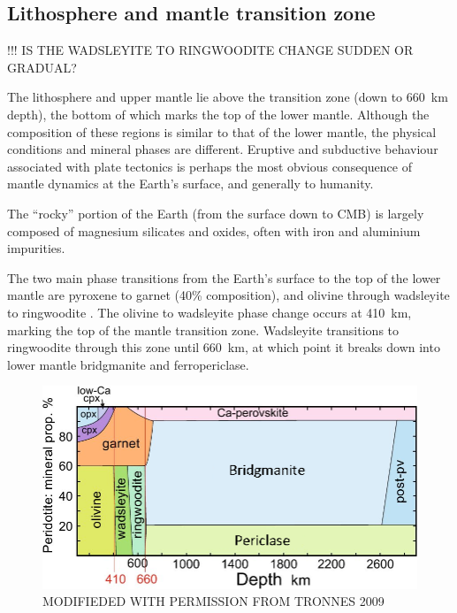 \subsection{Lithosphere and mantle transition zone}

!!! IS THE WADSLEYITE TO RINGWOODITE CHANGE SUDDEN OR GRADUAL?

The lithosphere and upper mantle lie above the transition zone (down to 660~km depth), the bottom of which marks the top of the lower mantle. Although the composition of these regions is similar to that of the lower mantle, the physical conditions and mineral phases are different. Eruptive and subductive behaviour associated with plate tectonics is perhaps the most obvious consequence of mantle dynamics at the Earth's surface, and generally to humanity.

The ``rocky'' portion of the Earth (from the surface down to CMB) is largely 
composed of magnesium silicates and oxides, often with iron and aluminium impurities. 

The two main phase transitions from the Earth's surface to the top of the lower mantle are pyroxene to garnet (40\% composition), and olivine through wadsleyite to ringwoodite \citep[60\%, see Figure~\ref{fig:tronnes_perid_comp}][]{Tronnes2009}. The olivine to wadsleyite phase change occurs at 410~km, marking the top of the mantle transition zone. Wadsleyite transitions to ringwoodite through this zone until 660~km, at which point it breaks down into lower mantle bridgmanite and ferropericlase.

\begin{figure}[h!]
  \includegraphics[width=\linewidth]{Figures/tronnes_perid_compo.png}
  \caption[TRONNES PERIDOTITE COMPOSITION DIAGRAM]{MODIFIEDED WITH PERMISSION FROM TRONNES 2009}
  \label{fig:tronnes_perid_comp}
\end{figure}
